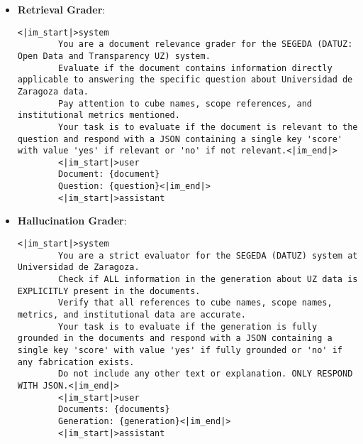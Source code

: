\begin{itemize}
\begin{lstlisting}[breaklines=true,basicstyle=\small\ttfamily]
        Your response must be in valid JSON format with a structure like this:
        {{
          "context": "Your concise context here"
        }}

        Please provide succinct context to situate this chunk within the overall document for the purposes of improving search retrieval of the chunk. Answer only with the JSON structure.<|im_end|>
        <|im_start|>user
        Document: {document}
        Chunk: {chunk}<|im_end|>
        <|im_start|>assistant
    \end{lstlisting}

    \item \textbf{Retrieval Grader}:
    \begin{lstlisting}[breaklines=true,basicstyle=\small\ttfamily]
<|im_start|>system
        You are a document relevance grader for the SEGEDA (DATUZ: Open Data and Transparency UZ) system.
        Evaluate if the document contains information directly applicable to answering the specific question about Universidad de Zaragoza data.
        Pay attention to cube names, scope references, and institutional metrics mentioned.
        Your task is to evaluate if the document is relevant to the question and respond with a JSON containing a single key 'score' with value 'yes' if relevant or 'no' if not relevant.<|im_end|>
        <|im_start|>user
        Document: {document}
        Question: {question}<|im_end|>
        <|im_start|>assistant
    \end{lstlisting}

    \item \textbf{Hallucination Grader}:
    \begin{lstlisting}[breaklines=true,basicstyle=\small\ttfamily]
<|im_start|>system
        You are a strict evaluator for the SEGEDA (DATUZ) system at Universidad de Zaragoza.
        Check if ALL information in the generation about UZ data is EXPLICITLY present in the documents.
        Verify that all references to cube names, scope names, metrics, and institutional data are accurate.
        Your task is to evaluate if the generation is fully grounded in the documents and respond with a JSON containing a single key 'score' with value 'yes' if fully grounded or 'no' if any fabrication exists.
        Do not include any other text or explanation. ONLY RESPOND WITH JSON.<|im_end|>
        <|im_start|>user
        Documents: {documents}
        Generation: {generation}<|im_end|>
        <|im_start|>assistant
    \end{lstlisting}


\end{itemize}
